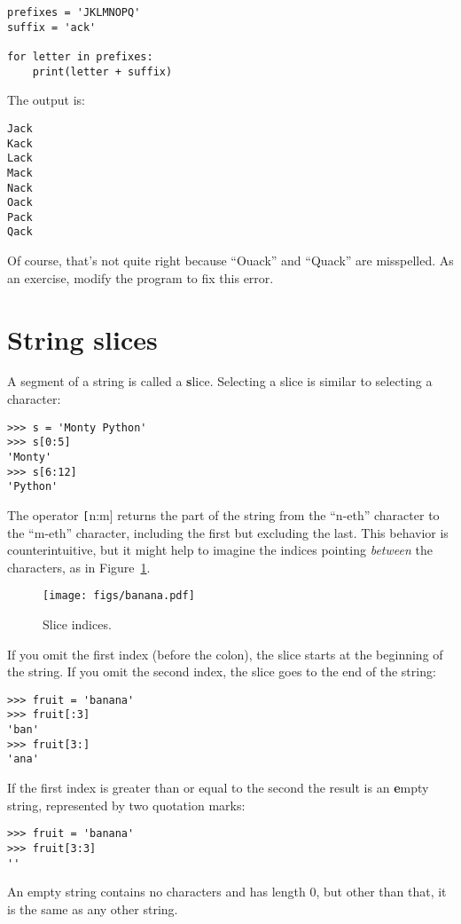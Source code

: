 \documentclass[
DIV=11,
fontsize=12,
twoside,
headinclude=false,
titlepage=firstiscover,
abstract=true,
headsepline=true,
footsepline=true,
chapterprefix=true, %
headings=big,
bibliography=totoc,%
captions=tableheading
]{scrbook}
\theoremstyle{definition}
\begin{document}
\begin{lstlisting}
prefixes = 'JKLMNOPQ'
suffix = 'ack'

for letter in prefixes:
    print(letter + suffix)
\end{lstlisting}
%
The output is:

\begin{lstlisting}
Jack
Kack
Lack
Mack
Nack
Oack
Pack
Qack
\end{lstlisting}
%
Of course, that's not quite right because ``Ouack'' and ``Quack'' are
misspelled.  As an exercise, modify the program to fix this error.



\section{String slices}
\label{slice}
  
 

A segment of a string is called a {\textbf slice}.  Selecting a slice is
similar to selecting a character:

\begin{lstlisting}
>>> s = 'Monty Python'
>>> s[0:5]
'Monty'
>>> s[6:12]
'Python'
\end{lstlisting}
%
The operator {\texttt [n:m]} returns the part of the string from the 
``n-eth'' character to the ``m-eth'' character, including the first but
excluding the last.  This behavior is counterintuitive, but it might
help to imagine the indices pointing {\em between} the
characters, as in Figure~\ref{fig.banana}.

\begin{figure}
\centerline
{\texttt{[image: figs/banana.pdf]}}
\caption{Slice indices.}
\label{fig.banana}
\end{figure}

If you omit the first index (before the colon), the slice starts at
the beginning of the string.  If you omit the second index, the slice
goes to the end of the string:

\begin{lstlisting}
>>> fruit = 'banana'
>>> fruit[:3]
'ban'
>>> fruit[3:]
'ana'
\end{lstlisting}
%
If the first index is greater than or equal to the second the result
is an {\textbf empty string}, represented by two quotation marks:

\begin{lstlisting}
>>> fruit = 'banana'
>>> fruit[3:3]
''
\end{lstlisting}
%
An empty string contains no characters and has length 0, but other
than that, it is the same as any other string.
\end{document}
